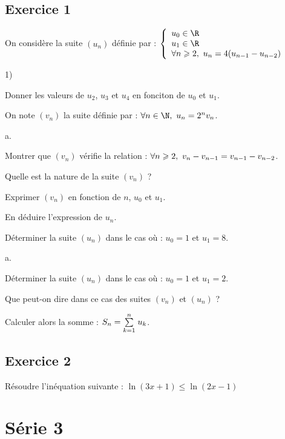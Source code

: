 \documentclass[11pt]{article}%
\begin{document}
\subsection*{Exercice 1}
\noindent
  On considère la suite $(u_n)$ définie par : $
  \left\{
  \begin{array}{l}
    u_0 \in \R \\
    u_1 \in \R \\
    \forall n \Geq 2, \ u_n = 4(u_{n-1} - u_{n-2})
  \end{array}
  \right.
  $
  \begin{noliste}{1)}
  \item Donner les valeurs de $u_2$, $u_3$ et $u_4$ en fonciton de
    $u_0$ et $u_1$.
  \item On note $(v_n)$ la suite définie par : $\forall n \in \N, \
    u_n = 2^n v_n$.
    \begin{noliste}{a.}
    \item Montrer que $(v_n)$ vérifie la relation : $\forall n \geqslant 2,
      \ v_{n} - v_{n-1} = v_{n-1} - v_{n-2}$.
    \item Quelle est la nature de la suite $(v_n)$ ?
    \item Exprimer $(v_n)$ en fonction de $n$, $u_0$ et $u_1$.
    \item En déduire l'expression de $u_n$.
    \end{noliste}
  \item Déterminer la suite $(u_n)$ dans le cas où : $u_0 = 1$ et $u_1
    = 8$.
  \item
    \begin{noliste}{a.}
    \item Déterminer la suite $(u_n)$ dans le cas où : $u_0 = 1$ et
      $u_1 = 2$.
    \item Que peut-on dire dans ce cas des suites $(v_n)$ et $(u_n)$ ?
    \item Calculer alors la somme : $S_n = {\textstyle\sum\limits_{k=1}^{n}}\hspace{.1cm} u_k$.
    \end{noliste}
  \end{noliste}


\subsection*{Exercice 2}
\noindent
Résoudre l'inéquation suivante : $\ln(3x+1) \leq \ln (2x-1)$


\newpage


\section{Série 3}
\end{document}
